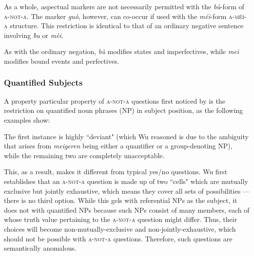 \documentclass[12pt, UTF8]{article}
\begin{document}
As a whole, aspectual markers are not necessarily permitted with the \textit{b\`{u}}-form of \textsc{a-not-a}. The marker \textit{gu\`{o}}, however, can co-occur if used with the \textit{m\'{e}i}-form \textsc{a-m\'{e}i-a} structure. This restriction is identical to that of an ordinary negative sentence involving \textit{\`{bu}} or \textit{m\`{e}i}.

As with the ordinary negation, \textit{b\`{u}} modifies states and imperfectives, while \textit{mei} modifies bound events and perfectives.


\subsubsection{Quantified Subjects}

A property particular property of \textsc{a-not-a} questions first noticed by \cite{Wu1997} is the restriction on quantified noun phrases (NP) in subject position, as the following examples show:

The first instance is highly ``deviant" (which Wu reasoned is due to the ambiguity that arises from \textit{meigeren} being either a quantifier or a group-denoting NP), while the remaining two are completely unacceptable.

This, as a result, makes it different from typical yes/no questions. Wu first establishes that an \textsc{a-not-a} question is made up of two ``cells" which are mutually exclusive but jointly exhaustive, which means they cover all sets of possibilities --- there is no third option. While this gels with referential NPs as the subject, it does not with quantified NPs because such NPs consist of many members, each of whose truth value pertaining to the \textsc{a-not-a} question might differ. Thus, their choices will become non-mutually-exclusive and non-jointly-exhaustive, which should not be possible with \textsc{a-not-a} questions. Therefore, such questions are semantically anomalous.

%
\end{document}
